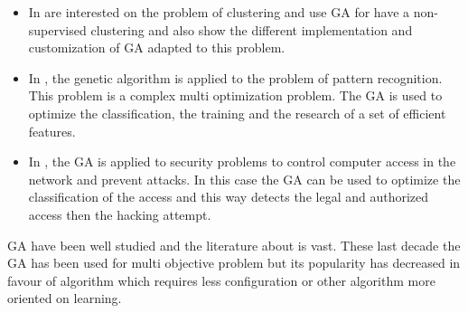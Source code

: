 
\begin{itemize}

\item In \cite{117*sheikh2008} are interested on the problem of clustering and use GA for have a non-supervised clustering and also show the different implementation and customization of GA adapted to this problem. 
\item In \cite{ 122*wang1996}, the genetic algorithm is applied to the problem of pattern recognition. This problem is a complex multi optimization problem. The GA is used to optimize the classification, the training and the research of a set of efficient features. 
\item In \cite{ 123*owais2008}, the GA is applied to security problems to control computer access in the network and prevent attacks. In this case the GA can be used to optimize the classification of the access and this way detects the legal and authorized access then the hacking attempt.   
 
\end{itemize}

GA have been well studied  and the literature about is vast. These last decade the GA  has been used for multi objective problem but  its popularity has decreased in favour of algorithm which requires less configuration or other algorithm  more oriented on learning.  
